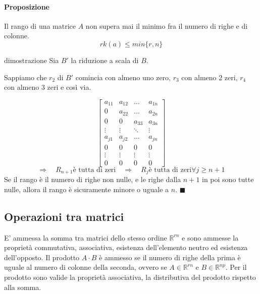 \documentclass[x11names]{article}
\newcommand*{\QEDA}{\null\nobreak\hfill\ensuremath{\blacksquare}}%
\begin{document}
\paragraph{Proposizione}
Il rango di una matrice $A$ non supera mai il minimo fra il numero di righe e di colonne.
\[
rk\left(a\right) \leq min\{r,n\} 
\]

\begin{es}{dimostrazione}
Sia $B'$ la riduzione a scala di $B$.
 
Sappiamo che $r_2$ di $B'$ comincia con almeno uno zero, $r_3$ con almeno 2 zeri, $r_4$ con almeno 3 zeri e così via. 

\[
\begin{bmatrix}
	a_{11} & a_{12} & \dots & a_{1n}  \\
	0     & a_{22}& \dots & a_{2n}  \\
	0 & 0 & a_{33} &  a_{3n}  \\
	\vdots & \vdots & \ddots & \vdots \\
	a_{j1} & a_{j2} & \dots & a_{jn}  \\
	0 & 0 & 0 & 0 \\
	\vdots &\vdots &\vdots &\vdots \\
	0 & 0 & 0 & 0 
\end{bmatrix}
\] 
\[
\Rightarrow \quad R_{n+1} \text{è tutta di zeri}
\quad \Rightarrow \quad R_{j} \text{è tutta di zeri} \forall j \geq n + 1
\]
Se il rango è il numero di righe non nulle, e le righe dalla $n+1$ in poi sono tutte nulle, allora il rango è sicuramente minore o uguale a $n$. 
\QEDA
\end{es}


\subsection{Operazioni tra matrici}
E' ammessa la somma tra matrici dello stesso ordine $\mathbb{R}^{rn}$ e sono ammesse la proprietà commutativa, associativa, esistenza dell’elemento neutro ed esistenza dell’opposto. Il prodotto $A\cdot B$ è ammesso se il numero di righe della prima è uguale al numero di colonne della seconda, ovvero se $A \in \mathbb{R}^{rn}$ e $B\in \mathbb{R}^{np}$. Per il prodotto sono valide la proprietà associativa, la distributiva del prodotto rispetto alla somma.
\end{document}
